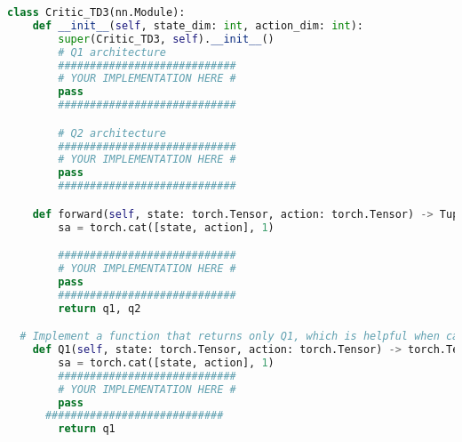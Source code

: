 \documentclass[12pt]{article}
\begin{document}
\begin{solution}
\begin{lstlisting}[language=Python]
class Critic_TD3(nn.Module):
	def __init__(self, state_dim: int, action_dim: int):
		super(Critic_TD3, self).__init__()
        # Q1 architecture
		############################
		# YOUR IMPLEMENTATION HERE #
		pass
		############################

		# Q2 architecture
		############################
		# YOUR IMPLEMENTATION HERE #
		pass
		############################

	def forward(self, state: torch.Tensor, action: torch.Tensor) -> Tuple[torch.Tensor, torch.Tensor]:
		sa = torch.cat([state, action], 1)

		############################
		# YOUR IMPLEMENTATION HERE #
		pass
		############################
		return q1, q2

  # Implement a function that returns only Q1, which is helpful when calculating actor loss
	def Q1(self, state: torch.Tensor, action: torch.Tensor) -> torch.Tensor:
		sa = torch.cat([state, action], 1)
		############################
		# YOUR IMPLEMENTATION HERE #
		pass
	  ############################
		return q1
\end{lstlisting}
\end{solution}
\end{document}
